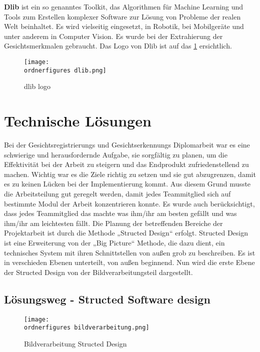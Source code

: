 	\textbf{Dlib} ist ein so genanntes Toolkit, das Algorithmen für Machine Learning
	und Tools zum Erstellen komplexer Software zur Lösung von Probleme der realen
	Welt beinhaltet.
	Es wird vielseitig eingesetzt, in Robotik, bei Mobilgeräte und unter anderem in
	Computer Vision.\cite{dlib} 
	Es wurde bei der Extrahierung der Gesichtsmerkmalen gebraucht. Das Logo von Dlib ist auf das \ref{fig:dlib logo} ersichtlich. 
	\begin{figure}[H]
		\centering
		\texttt{[image: \\ordnerfigures dlib.png]}
		\caption{dlib logo \cite{dlib}}
		\label{fig:dlib logo}
	\end{figure}
	


\section{Technische Lösungen}


	Bei der Gesichtsregistrierungs und Gesichtserkennungs Diplomarbeit war es eine
	schwierige und herausfordernde Aufgabe, sie sorgfältig zu planen, um die
	Effektivität bei der Arbeit zu steigern und das Endprodukt zufriedenstellend zu
	machen. 
	Wichtig war es die Ziele richtig zu setzen und sie gut abzugrenzen, damit es zu
	keinen Lücken bei der Implementierung kommt.
	Aus diesem Grund musste die Arbeitsteilung gut geregelt werden, damit jedes
	Teammitglied sich auf bestimmte Modul der Arbeit konzentrieren konnte.
	Es wurde auch berücksichtigt, dass jedes Teammitglied das machte was ihm/ihr am
	besten gefällt und was ihm/ihr am leichtesten fällt. 
	Die Planung der betreffenden Bereiche der Projektarbeit ist durch die Methode
	„Structed Design“ erfolgt. 
	Structed Design ist eine Erweiterung von der „Big Picture“ Methode, die dazu
	dient, ein technisches System mit ihren Schnittstellen von außen grob zu
	beschreiben. 
	Es ist in verschieden Ebenen unterteilt, von außen beginnend. 
	Nun wird die erste Ebene der Structed Design von der Bildverarbeitungsteil
	dargestellt. 

\subsection{Lösungsweg - Structed Software design} 


\begin{figure}
	\centering
	\texttt{[image: \\ordnerfigures bildverarbeitung.png]}
	\caption{ Bildverarbeitung Structed Design}
	\label{fig:bildverarbeitung}
\end{figure}

